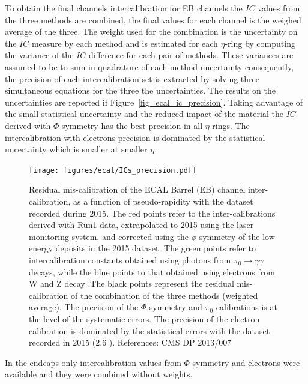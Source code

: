 To obtain the final channels intercalibration for EB channels the $IC$ values from the three methods are combined, the final values
for each channel is the weighed average of the three. The weight used for the combination is the uncertainty on the $IC$
measure by each method and is estimated for each $\eta$-ring by computing the variance of the $IC$ difference for each
pair of methods. These variances are assumed to be to sum in quadrature of each method uncertainty consequently,
the precision of each intercalibration set is extracted by solving three simultaneous equations for the three the uncertainties.
The results on the uncertainties are reported if Figure~\ref{fig_ecal_ic_precision}. Taking advantage of the
small statistical uncertainty and the reduced impact of the material the $IC$ derived with $\Phi$-symmetry has the best precision
in all $\eta$-rings. The intercalibration with electrons precision is dominated by the statistical uncertainty which
is smaller at smaller $\eta$.

\begin{figure}[h!]
  \centering
  \texttt{[image: figures/ecal/ICs\_precision.pdf]}
  \caption{Residual mis-calibration of the ECAL Barrel (EB) channel inter-calibration, as a function of pseudo-rapidity with the dataset recorded during 2015. The red points refer to the inter-calibrations derived with Run1 data, extrapolated to 2015 using the laser monitoring system, and corrected using the $\phi$-symmetry of the low energy deposits in the 2015 dataset. The green points refer to intercalibration constants obtained using photons from $\pi_0\to\gamma\gamma$ decays, while the blue points to that obtained using electrons from W and Z decay .The black points represent the residual mis-calibration of the combination of the three methods (weighted average). The precision of the $\Phi$-symmetry and $\pi_0$ calibrations is at the level of the systematic errors. The precision of the electron calibration is dominated by the statistical errors with the dataset recorded in 2015 (2.6 \fbinv). References: CMS DP 2013/007}
  \label{fig:ecal_ic_precision}
\end{figure}

In the endcaps only intercalibration values from $\Phi$-symmetry and electrons were available and they were combined
without weights.


